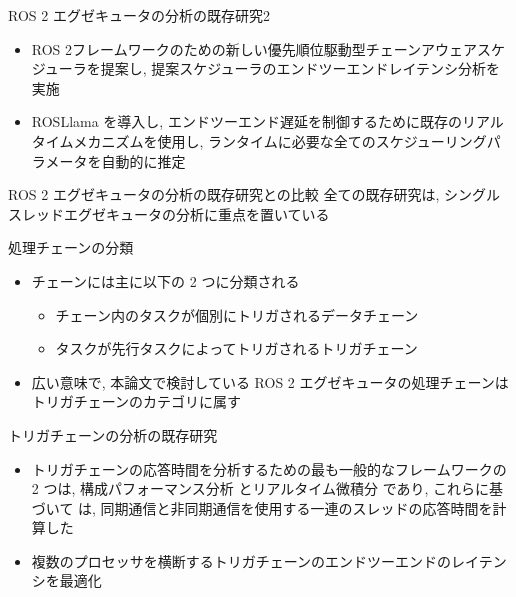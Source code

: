 \begin{frame}{ROS 2 エグゼキュータの分析の既存研究2}
    \begin{itemize}
        \item ROS 2フレームワークのための新しい優先順位駆動型チェーンアウェアスケジューラを提案し, 提案スケジューラのエンドツーエンドレイテンシ分析を実施 \cite{choi2021picas}
        \item ROSLlama を導入し, エンドツーエンド遅延を制御するために既存のリアルタイムメカニズムを使用し, ランタイムに必要な全てのスケジューリングパラメータを自動的に推定 \cite{blass2021automatic}
    \end{itemize}
\end{frame}

\begin{frame}{ROS 2 エグゼキュータの分析の既存研究との比較}
    全ての既存研究は, シングルスレッドエグゼキュータの分析に重点を置いている
\end{frame}


\begin{frame}{処理チェーンの分類}
    \begin{itemize}
        \item チェーンには主に以下の 2 つに分類される
              \begin{itemize}
                  \item チェーン内のタスクが個別にトリガされるデータチェーン
                  \item タスクが先行タスクによってトリガされるトリガチェーン
              \end{itemize}
        \item 広い意味で, 本論文で検討している ROS 2 エグゼキュータの処理チェーンはトリガチェーンのカテゴリに属す
    \end{itemize}
\end{frame}

\begin{frame}{トリガチェーンの分析の既存研究}
    \begin{itemize}
        \item トリガチェーンの応答時間を分析するための最も一般的なフレームワークの 2 つは, 構成パフォーマンス分析 \cite{henia2005system} とリアルタイム微積分 \cite{chakraborty2003general} であり, これらに基づいて \cite{schlatow2016response} は, 同期通信と非同期通信を使用する一連のスレッドの応答時間を計算した
        \item 複数のプロセッサを横断するトリガチェーンのエンドツーエンドのレイテンシを最適化 \cite{schliecker2009recursive}
    \end{itemize}
\end{frame}

